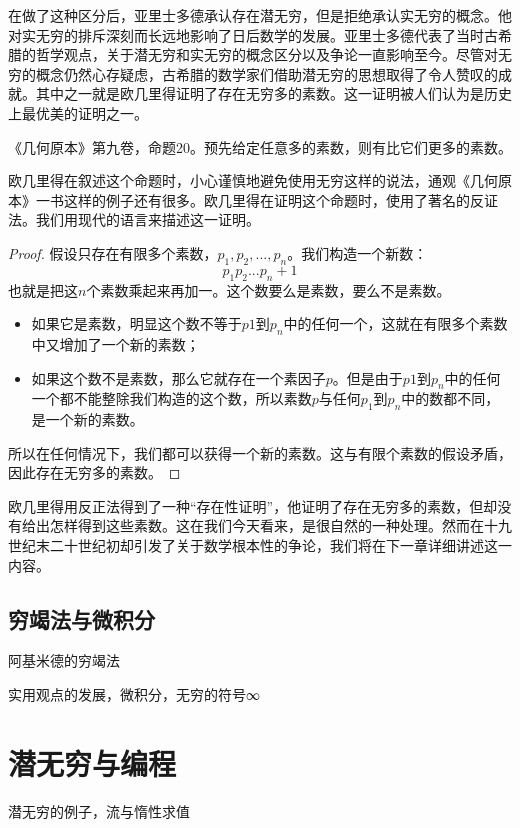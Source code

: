 \documentclass{article}
\begin{document}
在做了这种区分后，亚里士多德承认存在潜无穷，但是拒绝承认实无穷的概念。他对实无穷的排斥深刻而长远地影响了日后数学的发展\cite{HanXueTao16}。亚里士多德代表了当时古希腊的哲学观点，关于潜无穷和实无穷的概念区分以及争论一直影响至今。尽管对无穷的概念仍然心存疑虑，古希腊的数学家们借助潜无穷的思想取得了令人赞叹的成就。其中之一就是欧几里得证明了存在无穷多的素数。这一证明被人们认为是历史上最优美的证明之一。

\begin{theorem}
《几何原本》第九卷，命题20。预先给定任意多的素数，则有比它们更多的素数\cite{Elements}。
\end{theorem}

欧几里得在叙述这个命题时，小心谨慎地避免使用无穷这样的说法，通观《几何原本》一书这样的例子还有很多。欧几里得在证明这个命题时，使用了著名的反证法。我们用现代的语言来描述这一证明。

\begin{proof}
假设只存在有限多个素数，$p_1, p_2, ..., p_n$。我们构造一个新数：
\[
p_1 p_2 ... p_n + 1
\]
也就是把这$n$个素数乘起来再加一。这个数要么是素数，要么不是素数。

\begin{itemize}
\item 如果它是素数，明显这个数不等于$p1$到$p_n$中的任何一个，这就在有限多个素数中又增加了一个新的素数；
\item 如果这个数不是素数，那么它就存在一个素因子$p$。但是由于$p1$到$p_n$中的任何一个都不能整除我们构造的这个数，所以素数$p$与任何$p_1$到$p_n$中的数都不同，是一个新的素数。
\end{itemize}
所以在任何情况下，我们都可以获得一个新的素数。这与有限个素数的假设矛盾，因此存在无穷多的素数。
\end{proof}

欧几里得用反正法得到了一种“存在性证明”，他证明了存在无穷多的素数，但却没有给出怎样得到这些素数。这在我们今天看来，是很自然的一种处理。然而在十九世纪末二十世纪初却引发了关于数学根本性的争论，我们将在下一章详细讲述这一内容。

\subsection{穷竭法与微积分}
阿基米德的穷竭法

实用观点的发展，微积分，无穷的符号∞

\section{潜无穷与编程}
潜无穷的例子，流与惰性求值
\end{document}
